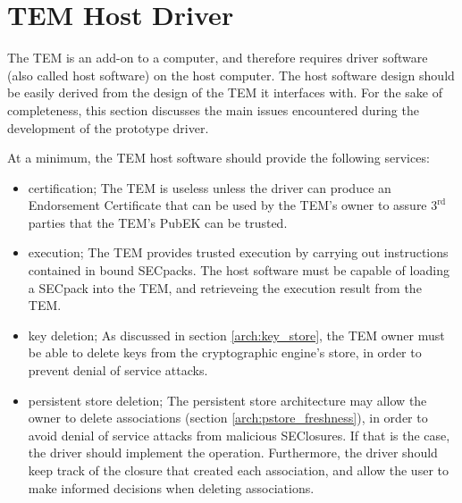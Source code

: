 \section{TEM Host Driver}\label{arch:driver}

The TEM is an add-on to a computer, and therefore requires driver software
(also called host software) on the host computer. The host software design
should be easily derived from the design of the TEM it interfaces with. For the
sake of completeness, this section discusses the main issues encountered during
the development of the prototype driver.

At a minimum, the TEM host software should provide the following services:
\begin{itemize}
  \item {certification;} The TEM is useless unless the driver can produce an
  Endorsement Certificate that can be used by the TEM's owner to assure
  $3^\textrm{rd}$ parties that the TEM's PubEK can be trusted.
  \item {execution;} The TEM provides trusted execution by carrying out
  instructions contained in bound SECpacks. The host software must be capable
  of loading a SECpack into the TEM, and retrieveing the execution result from
  the TEM.
  \item {key deletion;} As discussed in section \ref{arch:key_store}, the TEM
  owner must be able to delete keys from the cryptographic engine's store, in
  order to prevent denial of service attacks.
  \item {persistent store deletion;} The persistent store architecture may
  allow the owner to delete associations (section \ref{arch:pstore_freshness}),
  in order to avoid denial of service attacks from malicious SEClosures. If that
  is the case, the driver should implement the operation. Furthermore, the
  driver should keep track of the closure that created each association, and
  allow the user to make informed decisions when deleting associations.
\end{itemize}

